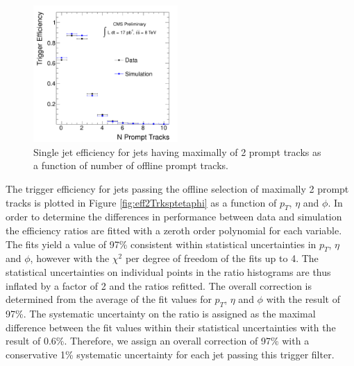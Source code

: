 \begin{figure}[htbp]
\centering
 \includegraphics[width=0.49\textwidth]{plots/trigger/effHT300_2Trk_NPromptTracks.pdf}
\caption{Single jet efficiency for jets having maximally of 2 prompt tracks as a function of number of offline prompt tracks. \label{fig:eff2Trks}}
\end{figure}

The trigger efficiency for jets passing the offline selection of maximally 2 prompt tracks 
is plotted in Figure \ref{fig:eff2Trksptetaphi}
 as a function of $p_T$, $\eta$ and $\phi$. In order to determine the differences in performance 
between data and simulation the efficiency ratios are fitted with a zeroth order polynomial for each variable.
The fits yield a value of 97\% consistent within statistical uncertainties in $p_T$, $\eta$ and $\phi$,
 however with the $\chi^2$ per degree of freedom of the fits up to 4. 
The statistical uncertainties on individual points in the ratio histograms
are thus inflated by a factor of 2 and the ratios refitted.
 The overall correction is determined from the average of the fit values for
$p_T$, $\eta$ and $\phi$ with the result of 97\%. The systematic uncertainty on the ratio 
is assigned as the maximal
difference between the fit values within their statistical uncertainties with the result of 0.6\%.
Therefore, we assign an overall correction of 97\% with a conservative 1\% systematic uncertainty for 
each jet passing this trigger filter. 
 
